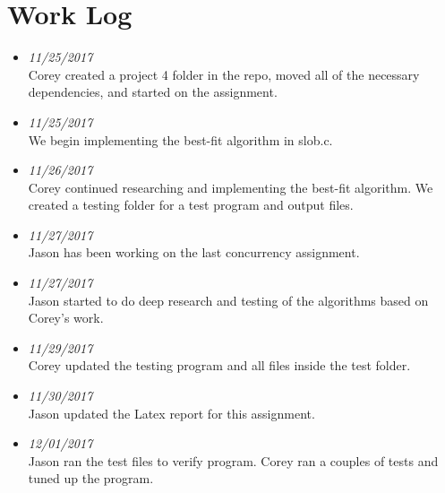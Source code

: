 \documentclass[onecolumn, draftclsnofoot,10pt, compsoc]{IEEEtran}
\begin{document}
\section{Work Log}
\begin{itemize}

\item \textit{11/25/2017}\\ Corey created a project 4 folder in the repo, moved all of the necessary dependencies, and started on the assignment. \item \textit{11/25/2017}\\ We begin implementing the best-fit algorithm in slob.c. \\
\item \textit{11/26/2017}\\ Corey continued researching and implementing the best-fit algorithm. We created a testing folder for a test program and output files. 
\item \textit{11/27/2017}\\ Jason has been working on the last concurrency assignment. \\
\item \textit{11/27/2017}\\ Jason started to do deep research and testing of the algorithms based on Corey's work. \\ 
\item \textit{11/29/2017}\\ Corey updated the testing program and all files inside the test folder. \\
\item \textit{11/30/2017}\\ Jason updated the Latex report for this assignment.
\item \textit{12/01/2017}\\ Jason ran the test files to verify program. Corey ran a couples of tests and tuned up the program. \\ 

\end{itemize} 
\end{document}
